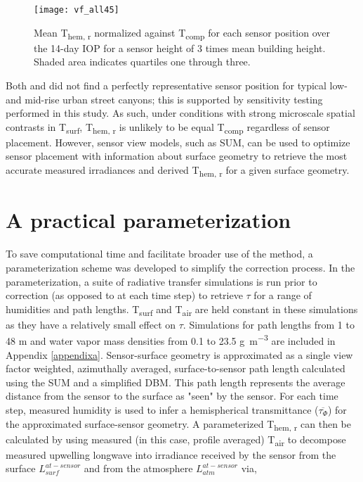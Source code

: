 \begin{bibunit}
  \begin{figure}[H]
	\centering
	\texttt{[image: vf\_all45]}
	\caption{Mean T\textsubscript{hem, r} normalized against T\textsubscript{comp} for each sensor position over the 14-day IOP for a sensor height of 3 times mean building height. Shaded area indicates quartiles one through three.}
	\label{vf_all45}
\end{figure}
 
Both \citet{Roberts2010} and \citet{Adderley2015} did not find a perfectly representative sensor position for typical low- and mid-rise urban street canyons; this is supported by sensitivity testing performed in this study. As such, under conditions with strong microscale spatial contrasts in T\textsubscript{surf}, T\textsubscript{hem, r} is unlikely to be equal T\textsubscript{comp} regardless of sensor placement. However, sensor view models, such as SUM, can be used to optimize sensor placement with information about surface geometry to retrieve the most accurate measured irradiances and derived T\textsubscript{hem, r} for a given surface geometry.

\section{A practical parameterization}

To save computational time and facilitate broader use of the method, a parameterization scheme was developed to simplify the correction process. In the parameterization, a suite of radiative transfer simulations is run prior to correction (as opposed to at each time step) to retrieve $\tau$ for a range of humidities and path lengths. T\textsubscript{surf} and T\textsubscript{air} are held constant in these simulations as they have a relatively small effect on $\tau$. Simulations for path lengths from 1 to 48 \si{\meter} and water vapor mass densities from 0.1 to 23.5 \si{\gram\per\meter\cubed} are included in Appendix \ref{appendixa}. Sensor-surface geometry is approximated as a single view factor weighted, azimuthally averaged, surface-to-sensor path length calculated using the SUM \citep{Soux2004} and a simplified DBM. This path length represents the average distance from the sensor to the surface as "seen" by the sensor. For each time step, measured humidity is used to infer a hemispherical transmittance ($\overline{\tau_{\Phi}}$) for the approximated surface-sensor geometry. A parameterized T\textsubscript{hem, r} can then be calculated by using measured (in this case, profile averaged) T\textsubscript{air} to decompose measured upwelling longwave into irradiance received by the sensor from the surface $L_{surf}^{at-sensor}$ and from the atmosphere $L_{atm}^{at-sensor}$ via, 


\end{bibunit}
